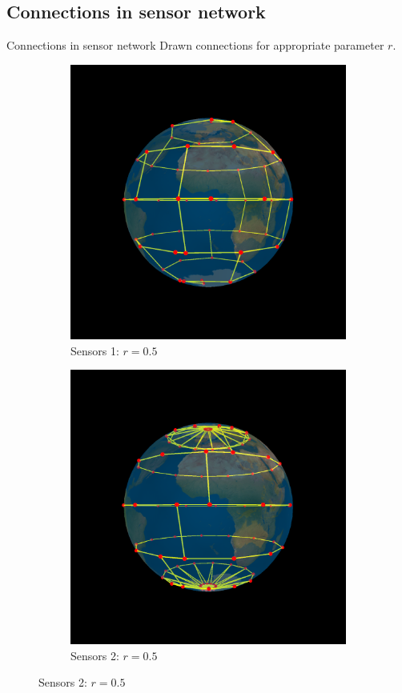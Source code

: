 \documentclass{beamer}
\begin{document}
\subsection{Connections in sensor network}
\begin{frame}{Connections in sensor network}
Drawn connections for appropriate parameter $r$.
\begin{figure}[!ht]
	\centering
	\begin{subfigure}{.5\textwidth}
		\centering
		\includegraphics[scale=0.15]{used_images/connections01}
		\caption{Sensors 1: $r = 0.5$}
	\end{subfigure}%
	\begin{subfigure}{.5\textwidth}
		\centering
		\includegraphics[scale=0.15]{used_images/connections02}
		\caption{Sensors 2: $r = 0.5$}
	\end{subfigure}%
	

\end{figure}
\end{frame}
\end{document}
